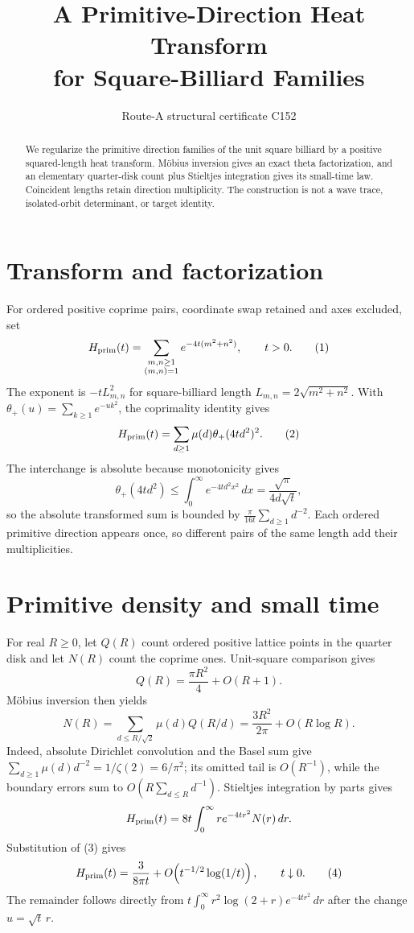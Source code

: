\documentclass[10pt]{article}
\title{\vspace{-1.8em}A Primitive-Direction Heat Transform\\for Square-Billiard Families}
\author{Route-A structural certificate C152}
\date{}
\begin{document}
\maketitle
\begin{abstract}
We regularize the primitive direction families of the unit square billiard by
a positive squared-length heat transform.  M\"obius inversion gives an exact
theta factorization, and an elementary quarter-disk count plus Stieltjes
integration gives its small-time law.  Coincident lengths retain direction
multiplicity.  The construction is not a wave trace, isolated-orbit
determinant, or target identity.
\end{abstract}

\section{Transform and factorization}
For ordered positive coprime pairs, coordinate swap retained and axes
excluded, set
\begin{equation}
H_{\rm prim}(t)=\sum_{\substack{m,n\geq1\\(m,n)=1}}
 e^{-4t(m^2+n^2)},\qquad t>0.                    \tag{1}
\end{equation}
The exponent is $-tL_{m,n}^2$ for square-billiard length
$L_{m,n}=2\sqrt{m^2+n^2}$.  With
$\theta_+(u)=\sum_{k\geq1}e^{-uk^2}$, the coprimality identity gives
\begin{equation}
H_{\rm prim}(t)=\sum_{d\geq1}\mu(d)\theta_+(4td^2)^2.      \tag{2}
\end{equation}
The interchange is absolute because monotonicity gives
\[
\theta_+(4td^2)\leq\int_0^\infty e^{-4td^2x^2}\,dx
=\frac{\sqrt\pi}{4d\sqrt t},
\]
so the absolute transformed sum is bounded by
$\frac{\pi}{16t}\sum_{d\geq1}d^{-2}$.  Each ordered primitive direction
appears once, so different pairs of the same length add their multiplicities.

\section{Primitive density and small time}
For real $R\geq0$, let $Q(R)$ count ordered positive lattice points in the
quarter disk and let $N(R)$ count the coprime ones.  Unit-square comparison
gives
\[
Q(R)=\frac{\pi R^2}{4}+O(R+1).
\]
M\"obius inversion then yields
\begin{equation}
N(R)=\sum_{d\leq R/\sqrt2}\mu(d)Q(R/d)
    =\frac{3R^2}{2\pi}+O(R\log R).               \tag{3}
\end{equation}
Indeed, absolute Dirichlet convolution and the Basel sum give
$\sum_{d\geq1}\mu(d)d^{-2}=1/\zeta(2)=6/\pi^2$; its omitted tail is
$O(R^{-1})$, while the boundary errors sum to
$O(R\sum_{d\leq R}d^{-1})$.
Stieltjes integration by parts gives
\[
H_{\rm prim}(t)=8t\int_0^\infty r e^{-4tr^2}N(r)\,dr.
\]
Substitution of (3) gives
\begin{equation}
H_{\rm prim}(t)=\frac{3}{8\pi t}
 +O\!\left(t^{-1/2}\log(1/t)\right),\qquad t\downarrow0.  \tag{4}
\end{equation}
The remainder follows directly from
$t\int_0^\infty r^2\log(2+r)e^{-4tr^2}\,dr$ after the change
$u=\sqrt t\,r$.
\end{document}
